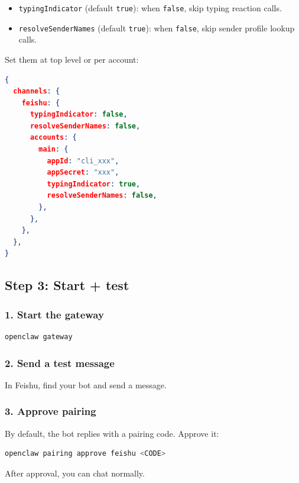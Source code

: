 \begin{itemize}
  \item \texttt{typingIndicator} (default \texttt{true}): when \texttt{false}, skip typing reaction calls.
  \item \texttt{resolveSenderNames} (default \texttt{true}): when \texttt{false}, skip sender profile lookup calls.
\end{itemize}


Set them at top level or per account:

\begin{lstlisting}[language=json]
{
  channels: {
    feishu: {
      typingIndicator: false,
      resolveSenderNames: false,
      accounts: {
        main: {
          appId: "cli_xxx",
          appSecret: "xxx",
          typingIndicator: true,
          resolveSenderNames: false,
        },
      },
    },
  },
}
\end{lstlisting}


\hrulefill


\subsection{Step 3: Start + test}


\subsubsection{1. Start the gateway}


\begin{lstlisting}[language=bash]
openclaw gateway
\end{lstlisting}


\subsubsection{2. Send a test message}


In Feishu, find your bot and send a message.

\subsubsection{3. Approve pairing}


By default, the bot replies with a pairing code. Approve it:

\begin{lstlisting}[language=bash]
openclaw pairing approve feishu <CODE>
\end{lstlisting}


After approval, you can chat normally.

